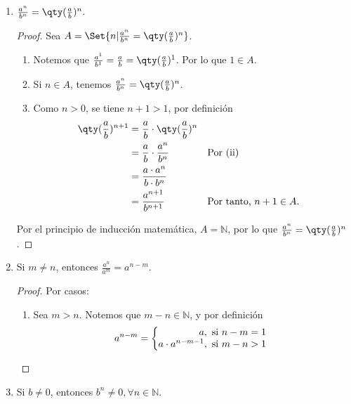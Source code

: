 \documentclass[11pt]{article}
\newcommand{\N}{\mathbb{N}}
\let\set\Set
\begin{document}
\begin{enumerate}[label=\alph*)]
    \item $\frac{a^n}{b^n}= \qty(\frac{a}{b})^n$.
    \vspace{-1em}
    \begin{proof}
    Sea $A=\set{n|\frac{a^n}{b^n}= \qty(\frac{a}{b})^n}$.\begin{enumerate}[label=\roman*)]
    \item Notemos que $\frac{a^1}{b^1}= \frac{a}{b}= \qty(\frac{a}{b})^1$. Por lo que $1\in A$.
    \item Si $n\in A$, tenemos $\frac{a^n}{b^n}= \qty(\frac{a}{b})^n$.
    \item Como $n>0$, se tiene $n+1>1$, por definición \vspace{1em}\begin{align*}
            \qty(\frac{a}{b})^{n+1} &= \frac{a}{b}\cdot \qty(\frac{a}{b})^n\\
            &=\frac{a}{b}\cdot \frac{a^n}{b^n} && \text{Por (ii)}\\
            &= \frac{a\cdot a^n}{b\cdot b^n}\\
            &= \frac{a^{n+1}}{b^{n+1}} && \text{Por tanto, $n+1\in A$.}
        \end{align*}\vspace{-2em}
    \end{enumerate}\vspace{1em}
    Por el principio de inducción matemática, $A=\N$, por lo que $\frac{a^n}{b^n}= \qty(\frac{a}{b})^n$.
    \end{proof} \vspace{-1em}

    \item Si $m\neq n$, entonces $\frac{a^n}{a^m} = a^{n-m}$.
    \vspace{-1em}
    \begin{proof}
    Por casos: \vspace{-1em}\begin{enumerate}[label=\roman*)]
    \item Sea $m>n$. Notemos que $m-n\in \N$, y por definición \vspace{1em}\begin{align*}
        a^{n-m} = \left\{
            \begin{array}{@{}r@{\thinspace}l}
                a, &  \ \text{si}  \ n-m = 1\\
                a\cdot a^{n-m-1}, &  \ \text{si}  \ m-n > 1
            \end{array} \right.
        \end{align*}\vspace{-1em}
    \end{enumerate}\vspace{-1em}
    \end{proof} \vspace{-1em}

    \item Si $b\neq 0$, entonces $b^n \neq 0, \forall n\in \N$.

\end{enumerate}
\end{document}
